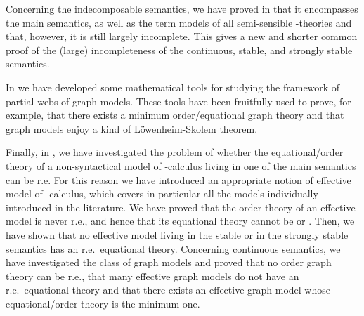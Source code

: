 \documentclass[english]{llncs}
\begin{document}
Concerning the indecomposable semantics, we have proved in \cite[Chapter~4]{ManzonettoTh} that it encompasses the main semantics, as well as the term models of all 
semi-sensible -theories and that, however, it is still largely incomplete.
This gives a new and shorter common proof of the (large) incompleteness of the continuous, stable, and strongly stable semantics.

In \cite[Chapter~5]{ManzonettoTh} we have developed some mathematical tools for studying the framework of partial webs of graph models. 
These tools have been fruitfully used to prove, for example, that there exists a minimum order/equational graph theory and that graph models enjoy a kind of 
L\"owenheim-Skolem theorem.

Finally, in \cite[Chapter~6]{ManzonettoTh}, we have investigated the problem of whether the equational/order theory of a non-syntactical model 
of -calculus living in one of the main semantics can be r.e.
For this reason we have introduced an appropriate notion of effective model of -calculus, which covers in particular all the models individually 
introduced in the literature.
We have proved that the order theory of an effective model is never r.e., and hence that its equational theory cannot be  or .
Then, we have shown that no effective model living in the stable or in the strongly stable semantics has an r.e.\ equational theory.
Concerning continuous semantics, we have investigated the class of graph models and proved that no order graph theory can be r.e., 
that many effective graph models do not have an r.e.\ equational theory and that there exists an effective graph model whose equational/order theory is the minimum one.




\end{document}
